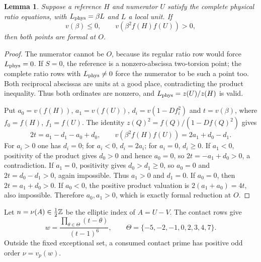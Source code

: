 \documentclass[11pt,a4paper]{article}
\newtheorem{lemma}[theorem]{Lemma}
\begin{document}
\begin{lemma}\label{lem:branches}
Suppose a reference $H$ and numerator $U$ satisfy the complete
physical ratio equations, with $L_{\rm phys}=\beta L$ and $L$ a
local unit. If
\[
 v(\beta)\le0,\qquad v(\beta^2f(H)f(U))>0,
\]
then both points are formal at $O$.
\end{lemma}
\begin{proof}
The numerator cannot be $O$, because its regular ratio row would
force $L_{\rm phys}=0$. If $S=0$, the reference is a nonzero-abscissa
two-torsion point; the complete ratio rows with
$L_{\rm phys}\ne0$ force the numerator to be such a point too.
Both reciprocal abscissas are units at a good place, contradicting
the product inequality. Thus both ordinates are nonzero, and
$L_{\rm phys}=z(U)/z(H)$ is valid.

Put $a_0=v(f(H))$, $a_1=v(f(U))$,
$d_i=v(1-D f_i^2)$ and $t=v(\beta)$, where $f_0=f(H)$,
$f_1=f(U)$. The identity $z(Q)^2=f(Q)/(1-Df(Q)^2)$ gives
\[
 2t=a_1-d_1-a_0+d_0,\qquad
 v(\beta^2f(H)f(U))=2a_1+d_0-d_1.
\]
For $a_i>0$ one has $d_i=0$; for $a_i<0$, $d_i=2a_i$;
for $a_i=0$, $d_i\ge0$.
If $a_1<0$, positivity of the product gives $d_0>0$ and hence
$a_0=0$, so $2t=-a_1+d_0>0$, a contradiction.
If $a_1=0$, positivity gives $d_0>d_1\ge0$, so $a_0=0$ and
$2t=d_0-d_1>0$, again impossible.
Thus $a_1>0$ and $d_1=0$. If $a_0=0$, then
$2t=a_1+d_0>0$. If $a_0<0$, the positive product valuation is
$2(a_1+a_0)=4t$, also impossible. Therefore $a_0,a_1>0$,
which is exactly formal reduction at $O$.
\end{proof}

Let $n=\nu(A)\in\tfrac12\mathbb Z$ be the elliptic index of $A=U-V$.
The contact rows give
\[
 w=\frac{\prod_{\theta\in\Theta}(t-\theta)}{(t-1)^6},
 \qquad\Theta=\{-5,-2,-1,0,2,3,4,7\}.
\]
Outside the fixed exceptional set, a consumed contact prime has
positive odd order $\nu=v_p(w)$.
\end{document}
